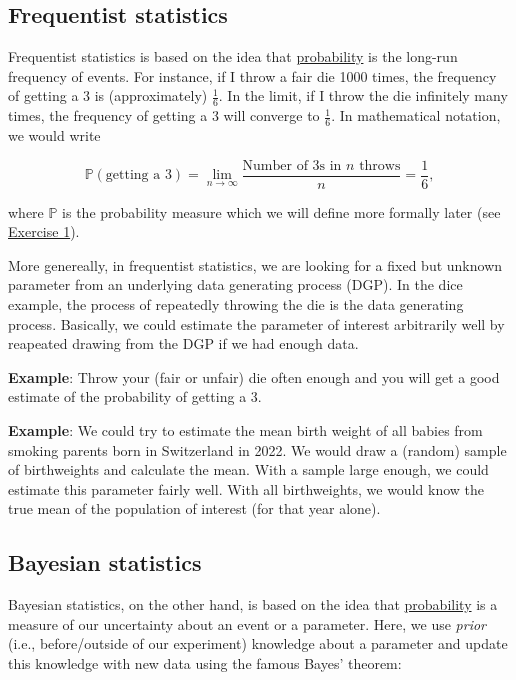 \documentclass[
]{book}
\begin{document}
\subsection{Frequentist statistics}\label{frequentist-statistics}

Frequentist statistics is based on the idea that \href{https://en.wikipedia.org/wiki/Frequentist_probability}{probability} is the long-run
frequency of events. For instance, if I throw a fair die 1000 times, the frequency of getting a 3 is (approximately) \(\frac{1}{6}\). In the limit,
if I throw the die infinitely many times, the frequency of getting a 3 will converge to \(\frac{1}{6}\). In mathematical notation, we would write

\[
\mathbb{P}(\text{getting a 3}) = \lim_{n \to \infty} \frac{\text{Number of 3s in } n \text{ throws}}{n} = \frac{1}{6},
\]

where \(\mathbb{P}\) is the probability measure which we will define more formally later (see \hyperref[exercise1]{Exercise 1}).

More genereally, in frequentist statistics, we are looking for a fixed but unknown parameter from an underlying data generating process (DGP).
In the dice example, the process of repeatedly throwing the die is the data generating process.
Basically, we could estimate the parameter of interest arbitrarily well by reapeated drawing from the DGP if we had enough data.

\textbf{Example}: Throw your (fair or unfair) die often enough and you will get a good estimate of the probability of getting a 3.

\textbf{Example}: We could try to estimate the mean birth weight of all babies from smoking parents born in Switzerland in 2022.
We would draw a (random) sample of birthweights and calculate the mean. With a sample large enough, we could estimate this parameter fairly well.
With all birthweights, we would know the true mean of the population of interest (for that year alone).

\subsection{Bayesian statistics}\label{bayesian-statistics}

Bayesian statistics, on the other hand, is based on the idea that \href{https://en.wikipedia.org/wiki/Bayesian_probability}{probability} is a measure of our uncertainty about an event or a parameter.
Here, we use \emph{prior} (i.e., before/outside of our experiment) knowledge about a parameter and update this knowledge with new data using the famous Bayes' theorem:
\end{document}
